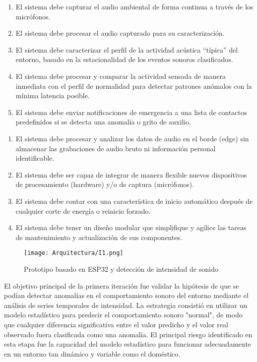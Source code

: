 \begin{enumerate}
      \item El sistema debe capturar el audio ambiental de forma continua a través de los micrófonos.
      \item El sistema debe procesar el audio capturado para su caracterización.
      \item El sistema debe caracterizar el perfil de la actividad acústica ``típica'' del entorno, basado en la estacionalidad de los eventos sonoros clasificados.
      \item El sistema debe procesar y comparar la actividad sensada de manera inmediata con el perfil de normalidad para detectar patrones anómalos con la mínima latencia posible.
      \item El sistema debe enviar notificaciones de emergencia a una lista de contactos predefinidos si se detecta una anomalía o grito de auxilio.
\end{enumerate}


\begin{enumerate}
      \item El sistema debe procesar y analizar los datos de audio en el borde (edge) sin almacenar las grabaciones de audio bruto ni información personal identificable.
      \item El sistema debe ser capaz de integrar de manera flexible nuevos dispositivos de procesamiento (hardware) y/o de captura (micrófonos).
      \item El sistema debe contar con una característica de inicio automático después de cualquier corte de energía o reinicio forzado.
      \item El sistema debe tener un diseño modular que simplifique y agilice las tareas de mantenimiento y actualización de sus componentes.
\end{enumerate}



      \begin{figure}[ht!]
            \centering
            \texttt{[image: Arquitectura/I1.png]}
            \caption{Prototipo basado en ESP32 y detección de intensidad de sonido}
            \label{fig:prototipo1}
      \end{figure}

El objetivo principal de la primera iteración fue validar la hipótesis de que se podían detectar anomalías en el comportamiento sonoro del entorno mediante el análisis de series temporales de intensidad. La estrategia consistió en utilizar un modelo estadístico para predecir el comportamiento sonoro "normal", de modo que cualquier diferencia significativa entre el valor predicho y el valor real observado fuera clasificada como una anomalía. El principal riesgo identificado en esta etapa fue la capacidad del modelo estadístico para funcionar adecuadamente en un entorno tan dinámico y variable como el doméstico.

